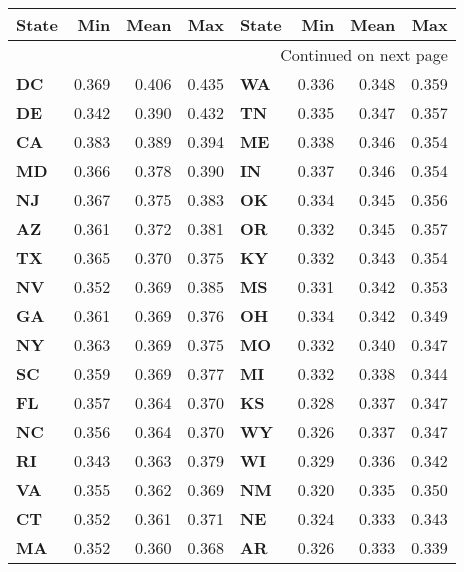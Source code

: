 \begin{longtable}{lrrr|lrrr}
\textbf{State} &  \textbf{Min} &  \textbf{Mean} &  \textbf{Max} & \textbf{State} &  \textbf{Min} &  \textbf{Mean} &  \textbf{Max} \\
\midrule
\endhead
\midrule
\multicolumn{8}{r}{{Continued on next page}} \\
\midrule
\endfoot
\endlastfoot

\textbf{DC} &    0.369 & 0.406 &    0.435 & \textbf{WA} &    0.336 & 0.348 &    0.359 \\
\textbf{DE} &    0.342 & 0.390 &    0.432 & \textbf{TN} &    0.335 & 0.347 &    0.357 \\
\textbf{CA} &    0.383 & 0.389 &    0.394 & \textbf{ME} &    0.338 & 0.346 &    0.354 \\
\textbf{MD} &    0.366 & 0.378 &    0.390 & \textbf{IN} &    0.337 & 0.346 &    0.354 \\
\textbf{NJ} &    0.367 & 0.375 &    0.383 & \textbf{OK} &    0.334 & 0.345 &    0.356 \\
\textbf{AZ} &    0.361 & 0.372 &    0.381 & \textbf{OR} &    0.332 & 0.345 &    0.357 \\
\textbf{TX} &    0.365 & 0.370 &    0.375 & \textbf{KY} &    0.332 & 0.343 &    0.354 \\
\textbf{NV} &    0.352 & 0.369 &    0.385 & \textbf{MS} &    0.331 & 0.342 &    0.353 \\
\textbf{GA} &    0.361 & 0.369 &    0.376 & \textbf{OH} &    0.334 & 0.342 &    0.349 \\
\textbf{NY} &    0.363 & 0.369 &    0.375 & \textbf{MO} &    0.332 & 0.340 &    0.347 \\
\textbf{SC} &    0.359 & 0.369 &    0.377 & \textbf{MI} &    0.332 & 0.338 &    0.344 \\
\textbf{FL} &    0.357 & 0.364 &    0.370 & \textbf{KS} &    0.328 & 0.337 &    0.347 \\
\textbf{NC} &    0.356 & 0.364 &    0.370 & \textbf{WY} &    0.326 & 0.337 &    0.347 \\
\textbf{RI} &    0.343 & 0.363 &    0.379 & \textbf{WI} &    0.329 & 0.336 &    0.342 \\
\textbf{VA} &    0.355 & 0.362 &    0.369 & \textbf{NM} &    0.320 & 0.335 &    0.350 \\
\textbf{CT} &    0.352 & 0.361 &    0.371 & \textbf{NE} &    0.324 & 0.333 &    0.343 \\
\textbf{MA} &    0.352 & 0.360 &    0.368 & \textbf{AR} &    0.326 & 0.333 &    0.339 \\

\end{longtable}
